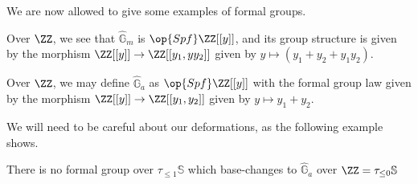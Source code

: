 \documentclass[../notes.tex]{subfiles}
\begin{document}
We are now allowed to give some examples of formal groups.
\begin{example}
	Over $\ZZ$, we see that $\widehat{\mathbb G}_m$ is $\op{Spf}\ZZ[[y]]$, and its group structure is given by the morphism $\ZZ[[y]]\to\ZZ[[y_1,yy_2]]$ given by $y\mapsto(y_1+y_2+y_1y_2)$.
\end{example}
\begin{example}
	Over $\ZZ$, we may define $\widehat{\mathbb G}_a$ as $\op{Spf}\ZZ[[y]]$ with the formal group law given by the morphism $\ZZ[[y]]\to\ZZ[[y_1,y_2]]$ given by $y\mapsto y_1+y_2$.
\end{example}
We will need to be careful about our deformations, as the following example shows.
\begin{exe}
	There is no formal group over $\tau_{\le1}\mathbb S$ which base-changes to $\widehat{\mathbb G}_a$ over $\ZZ=\tau_{\le0}\mathbb S$
\end{exe}
\end{document}
